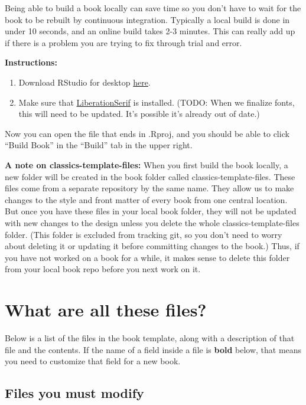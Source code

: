 \documentclass[
  english,
]{book}
\providecommand{\tightlist}{%
  \setlength{\itemsep}{0pt}\setlength{\parskip}{0pt}}
\begin{document}
Being able to build a book locally can save time so you don't have to wait for the book to be rebuilt by continuous integration. Typically a local build is done in under 10 seconds, and an online build takes 2-3 minutes. This can really add up if there is a problem you are trying to fix through trial and error.

\textbf{Instructions:}

\begin{enumerate}
\def\labelenumi{\arabic{enumi}.}
\tightlist
\item
  Download RStudio for desktop \href{https://rstudio.com/products/rstudio/}{here}.
\item
  Make sure that \href{https://www.fontsquirrel.com/fonts/liberation-serif}{LiberationSerif} is installed. (TODO: When we finalize fonts, this will need to be updated. It's possible it's already out of date.)
\end{enumerate}

Now you can open the file that ends in .Rproj, and you should be able to click ``Build Book'' in the ``Build'' tab in the upper right.

\textbf{A note on classics-template-files:} When you first build the book locally, a new folder will be created in the book folder called classics-template-files. These files come from a separate repository by the same name. They allow us to make changes to the style and front matter of every book from one central location. But once you have these files in your local book folder, they will not be updated with new changes to the design unless you delete the whole classics-template-files folder. (This folder is excluded from tracking git, so you don't need to worry about deleting it or updating it before committing changes to the book.) Thus, if you have not worked on a book for a while, it makes sense to delete this folder from your local book repo before you next work on it.

\hypertarget{what-are-all-these-files}{%
\section{What are all these files?}\label{what-are-all-these-files}}

Below is a list of the files in the book template, along with a description of that file and the contents. If the name of a field inside a file is \textbf{bold} below, that means you need to customize that field for a new book.

\hypertarget{files-you-must-modify}{%
\subsection{Files you must modify}\label{files-you-must-modify}}
\end{document}
